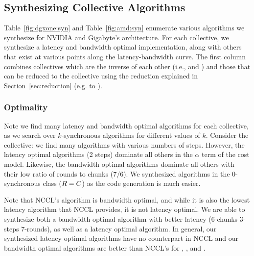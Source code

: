 
\subsection{Synthesizing Collective Algorithms}
Table~\ref{fig:dgxone:syn} and Table~\ref{fig:amd:syn} enumerate
various algorithms we synthesize for NVIDIA \dgxone and Gigabyte's
\amd architecture.  For each collective, we synthesize a latency and
bandwidth optimal implementation, along with others that exist at
various points along the latency-bandwidth curve. The first column
combines collectives which are the inverse of each other (i.e.,
\scatter and \gathercoll) and those that can be reduced to the
\broadcasting collective using the reduction explained in
Section~\ref{sec:reduction} (e.g. \reduce to \broadcast).

\subsubsection{Optimality}
Note we find many latency and bandwidth optimal algorithms
for each collective, as we search over $k$-synchronous algorithms for different values of $k$.
Consider the \allgather collective: we find many algorithms with various numbers
of steps. However, the latency optimal algorithms (2 steps) dominate all others
in the $\alpha$ term of the cost model.  Likewise, the bandwidth optimal
algorithms dominate all others with their low ratio of rounds to chunks ($7/6$).
We synthesized algorithms in the $0$-synchronous class ($R = C$) as
the code generation is much easier.


Note that NCCL's \allgather algorithm is bandwidth optimal,
and while it is also the lowest latency algorithm that NCCL provides, it is not latency optimal. We
are able to synthesize both a bandwidth optimal algorithm with better latency
(6-chunks 3-steps 7-rounds), as well as a latency optimal algorithm.
In general, our
synthesized latency optimal algorithms have no counterpart in NCCL
and our bandwidth optimal algorithms are better than NCCL's for \allgather,
\broadcast, and \reduce.

